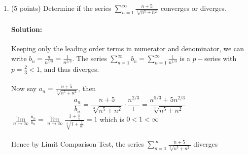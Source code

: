 \documentclass[paper=a4, fontsize=11pt]{scrartcl} %
\newcommand{\ds}{\displaystyle}
\numberwithin{equation}{section} %
\numberwithin{figure}{section} %
\numberwithin{table}{section} %
\begin{document}
\begin{enumerate}
\newpage
\item (5 points) Determine if the series $\ds\sum_{n=1}^{\infty}\frac{n+5}{\sqrt[3]{n^5+n^2}}$ converges or diverges.
\\\\
\textbf{Solution:}\\\\ Keeping only the leading order terms in numerator and denominator, we can write $b_n=\frac{n}{n^{5/3}}=\frac{1}{n^{2/3}}$. The series $\ds\sum_{n=1}^{\infty}b_n=\ds\sum_{n=1}^{\infty}\frac{1}{n^{2/3}}$ is a $p-$series with $p=\frac{2}{3}<1$, and thus diverges.\\\\
Now say $\ds a_n=\ds\frac{n+5}{\sqrt[3]{n^5+n^2}}$, then\hspace{2mm} $$\ds\frac{a_n}{b_n}=\ds\frac{n+5}{\sqrt[3]{n^5+n^2}}\cdot\frac{n^{2/3}}{1}=\ds\frac{n^{5/3}+5n^{2/3}}{\sqrt[3]{n^5+n^2}}$$
$\ds\lim\limits_{n\rightarrow\infty}\ds\frac{a_n}{b_n}=\lim\limits_{n\rightarrow\infty}\ds\frac{1+\frac{5}{n}}{{\sqrt[3]{1+\frac{1}{n^3}}}}=1$ which is $0<1<\infty$\\\\
Hence by Limit Comparison Test, the series
$\ds\sum_{n=1}^{\infty}\frac{n+5}{\sqrt[3]{n^5+n^2}}$ diverges



\end{enumerate}

\end{document}

